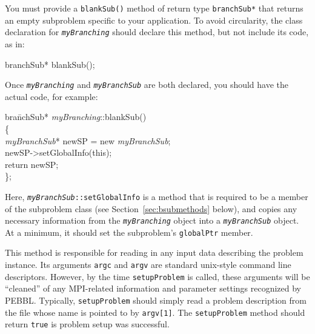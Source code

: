 You must provide a \texttt{blankSub()} method of return type
\texttt{branchSub*} that returns an empty subproblem specific to your
application.  To avoid circularity, the class declaration for
\texttt{\emph{myBranching}} should declare this method, but not
include its code, as in:
\begin{codeblock}
branchSub* blankSub();
\end{codeblock}
Once
\texttt{\emph{myBranching}} and
\texttt{\emph{myBranchSub}} are both declared, you should have the
actual code, for example:
\begin{codeblock}
bra\=nchSub* \emph{myBranching}::blankSub() \\
\{ \\
\>   \emph{myBranchSub}* newSP = new \emph{myBranchSub}; \\
\>    newSP->setGlobalInfo(this);\\
\>    return newSP; \\
\};
\end{codeblock}
Here, \texttt{\emph{myBranchSub}::setGlobalInfo} is a method that is
required to be a member of the subproblem class (see
Section~\ref{sec:bsubmethods} below), and
copies any necessary information from the 
\texttt{\emph{myBranching}} object into a \texttt{\emph{myBranchSub}}
object.  At a minimum, it should set the subproblem's
\texttt{globalPtr} member.  

This method is responsible for reading in any input data describing
the problem instance.  Its arguments \texttt{argc} and \texttt{argv}
are standard unix-style command line descriptors.  However, by the
time \texttt{setupProblem} is called, these arguments will be
``cleaned'' of any MPI-related information and parameter settings
recognized by PEBBL.  Typically, \texttt{setupProblem} should simply
read a problem description from the file whose name is pointed to 
by \texttt{argv[1]}.  The \texttt{setupProblem} method should return
\texttt{true} is problem setup was successful.


